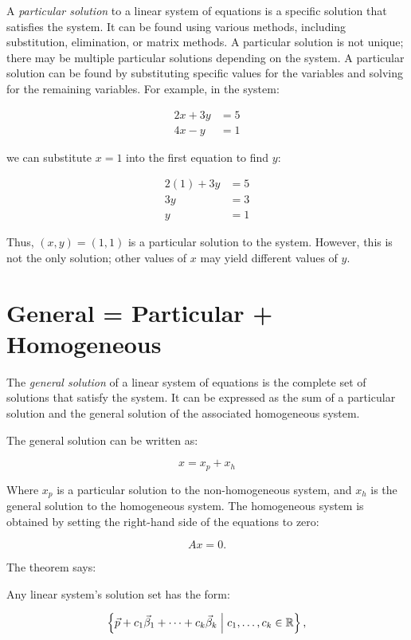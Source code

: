 A \emph{particular solution} to a linear system of equations is a specific solution that satisfies the system. It can be found using various methods, 
including substitution, elimination, or matrix methods. A particular solution is not unique; there may be multiple particular solutions depending on the 
system. A particular solution can be found by substituting specific values for the variables and solving for the remaining variables. For example, in 
the system:

\begin{align*}
    2x + 3y & = 5 \\
    4x - y  & = 1
\end{align*}

we can substitute \(x = 1\) into the first equation to find \(y\):

\begin{align*}
    2(1) + 3y & = 5 \\
    3y        & = 3 \\
    y         & = 1
\end{align*}

Thus, \((x, y) = (1, 1)\) is a particular solution to the system. However, this is not the only solution;
other values of \(x\) may yield different values of \(y\).

\section{General = Particular + Homogeneous}

The \emph{general solution} of a linear system of equations is the complete set of solutions that satisfy the
system. It can be expressed as the sum of a particular solution and the general solution of the associated
homogeneous system.

The general solution can be written as:

\[
    x = x_p + x_h
\]

Where \( x_p \) is a particular solution to the non-homogeneous system, and \( x_h \) is the general
solution to the homogeneous system. The homogeneous system is obtained by setting the right-hand side
of the equations to zero:

\[
    A x = 0.
\]

The theorem says:

Any linear system's solution set has the form:

\[
    \left\{ \vec{p} + c_1\vec{\beta}_1 + \cdots + c_k\vec{\beta}_k \;\middle|\; c_1, \ldots, c_k \in
    \mathbb{R} \right\},
\]

